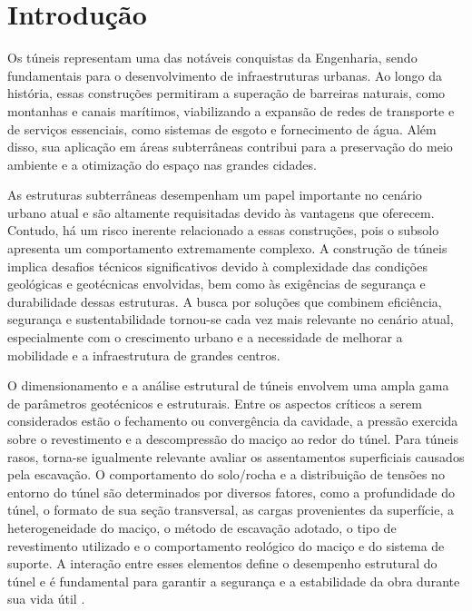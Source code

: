 %
%
%
%
\chapter{Introdução}\label{introducao}

Os túneis representam uma das notáveis conquistas da Engenharia, sendo fundamentais para o desenvolvimento de infraestruturas urbanas. Ao longo da história, essas construções permitiram a superação de barreiras naturais, como montanhas e canais marítimos, viabilizando a expansão de redes de transporte e de serviços essenciais, como sistemas de esgoto e fornecimento de água. Além disso, sua aplicação em áreas subterrâneas contribui para a preservação do meio ambiente e a otimização do espaço nas grandes cidades.

As estruturas subterrâneas desempenham um papel importante no cenário urbano atual e são altamente requisitadas devido às vantagens que oferecem. Contudo, há um risco inerente relacionado a essas construções, pois o subsolo apresenta um comportamento extremamente complexo. A construção de túneis implica desafios técnicos significativos devido à complexidade das condições geológicas e geotécnicas envolvidas, bem como às exigências de segurança e durabilidade dessas estruturas. A busca por soluções que combinem eficiência, segurança e sustentabilidade tornou-se cada vez mais relevante no cenário atual, especialmente com o crescimento urbano e a necessidade de melhorar a mobilidade e a infraestrutura de grandes centros.

O dimensionamento e a análise estrutural de túneis envolvem uma ampla gama de parâmetros geotécnicos e estruturais. Entre os aspectos críticos a serem considerados estão o fechamento ou convergência da cavidade, a pressão exercida sobre o revestimento e a descompressão do maciço ao redor do túnel. Para túneis rasos, torna-se igualmente relevante avaliar os assentamentos superficiais causados pela escavação. O comportamento do solo/rocha e a distribuição de tensões no entorno do túnel são determinados por diversos fatores, como a profundidade do túnel, o formato de sua seção transversal, as cargas provenientes da superfície, a heterogeneidade do maciço, o método de escavação adotado, o tipo de revestimento utilizado e o comportamento reológico do maciço e do sistema de suporte. A interação entre esses elementos define o desempenho estrutural do túnel e é fundamental para garantir a segurança e a estabilidade da obra durante sua vida útil \cite{Quevedo2021}.

